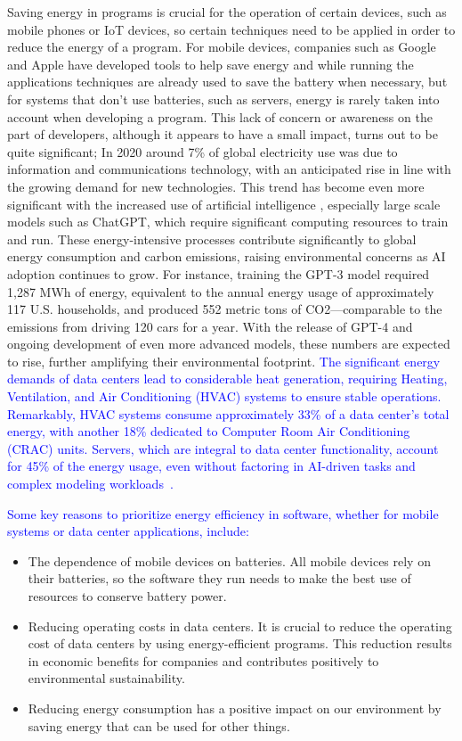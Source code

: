 \documentclass[sigplan]{acmart}
\newcommand{\wnote}[1]{\textcolor{blue}{#1}}
\begin{document}
Saving energy in programs is crucial for the operation of certain devices, such as mobile phones or IoT devices, so certain techniques need to be applied in order to reduce the energy of a program. For mobile devices, companies such as Google and Apple have developed tools\cite{google_adaptive_battery,google_battery_saver,apple_clean_energy, android_power_profiler} to help save energy and while running the applications techniques are already used to save the battery when necessary, but for systems that don't use batteries, such as servers, energy is rarely taken into account when developing a program. This lack of concern or awareness on the part of developers, although it appears to have a small impact, turns out to be quite significant; In 2020 around 7\% of global electricity use was due to information and communications technology, with an anticipated rise in line with the growing demand for new technologies\cite{article}. This trend has become even more significant with the increased use of artificial intelligence \cite{patterson2021carbon}, especially large scale models such as ChatGPT, which require significant computing resources to train and run. These energy-intensive processes contribute significantly to global energy consumption and carbon emissions, raising environmental concerns as AI adoption continues to grow. For instance, training the GPT-3 model required 1,287 MWh of energy, equivalent to the annual energy usage of approximately 117 U.S. households, and produced 552 metric tons of CO2—comparable to the emissions from driving 120 cars for a year. With the release of GPT-4 and ongoing development of even more advanced models, these numbers are expected to rise, further amplifying their environmental footprint. \wnote{The significant energy demands of data centers lead to considerable heat generation, requiring Heating, Ventilation, and Air Conditioning (HVAC) systems to ensure stable operations. Remarkably, HVAC systems consume approximately 33\% of a data center's total energy, with another 18\% dedicated to Computer Room Air Conditioning (CRAC) units. Servers, which are integral to data center functionality, account for 45\% of the energy usage, even without factoring in AI-driven tasks and complex modeling workloads~\cite{balaras2017high}.}

\wnote{Some key reasons to prioritize energy efficiency in software, whether for mobile systems or data center applications, include:}

\begin{itemize}
  \item The dependence of mobile devices on batteries. All mobile devices rely on their batteries, so the software they run needs to make the best use of resources to conserve battery power.
  \item Reducing operating costs in data centers. It is crucial to reduce the operating cost of data centers by using energy-efficient programs. This reduction results in economic benefits for companies and contributes positively to environmental sustainability. 
  \item Reducing energy consumption has a positive impact on our environment by saving energy that can be used for other things. 
\end{itemize}
\end{document}

